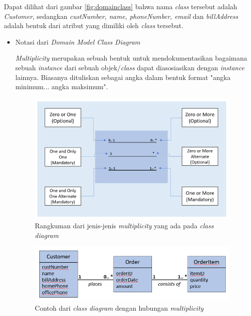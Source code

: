 \documentclass[a4paper]{article}
\begin{document}
\begin{enumerate}
\begin{enumerate}
        Dapat dilihat dari gambar \ref{fig:domainclass} bahwa nama \textit{class} tersebut adalah \textit{Customer}, sedangkan \textit{custNumber, name, phoneNumber, email} dan \textit{billAddress} adalah bentuk dari atribut yang dimiliki oleh \textit{class} tersebut.

        \begin{itemize}
            \item Notasi dari \textit{Domain Model Class Diagram}
            
            \textit{Multiplicity} merupakan sebuah bentuk untuk mendokumentasikan bagaimana sebuah \textit{instance} dari sebuah objek/\textit{class} dapat diasosiasikan dengan \textit{instance} lainnya. Biasanya dituliskan sebagai angka dalam bentuk format "angka minimum... angka maksimum"\autocite[103-114]{uml-satzinger}. 
            \newpage
            \begin{figure}[h]
                \centering
                \includegraphics[scale=0.35]{images/uml satzinger/domain class diagram/multiplicity summary.png}
                \caption{Rangkuman dari jenis-jenis \textit{multiplicity} yang ada pada \textit{class diagram}}
                \label{fig:multiplicity}
            \end{figure}

            \begin{figure}[h]
                \centering
                \includegraphics[scale=0.5]{images/uml satzinger/domain class diagram/contoh multiplicity classes.png}
                \caption{Contoh dari \textit{class diagram} dengan hubungan \textit{multiplicity}}
                \label{fig:contohmultiplicity}
            \end{figure}


\end{itemize}
\end{enumerate}
\end{enumerate}
\end{document}
